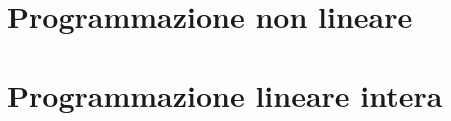 \providecommand{\main}{.}








{\hypersetup{hidelinks}
    \tableofcontents  %
}
\part{Programmazione non lineare}

\part{Programmazione lineare intera}





